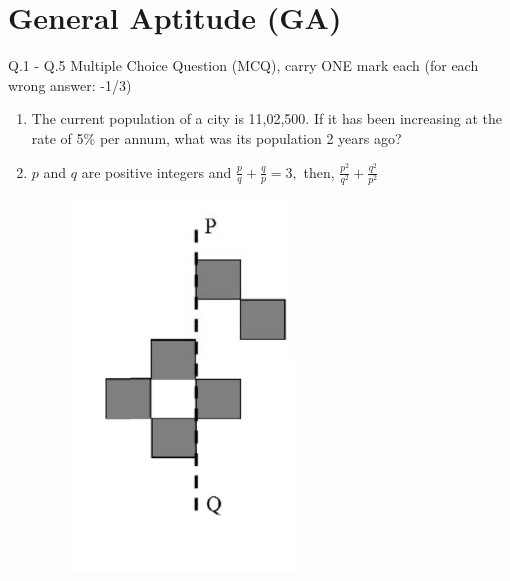 \documentclass[journal]{IEEEtran}
\begin{document}
\section{General Aptitude (GA)}
Q.1 - Q.5 Multiple Choice Question (MCQ), carry ONE mark each (for each wrong answer: -1/3)
\bigskip
\begin{enumerate}[start=1]
	\item The current population of a city is 11,02,500. If it has been increasing at the rate of 5\% per annum, what was its population 2 years ago?
    \hfill{}
\begin{enumerate}
\end{enumerate}

\item  $p$ and $q$ are positive integers and  $\frac{p}{q} + \frac{q}{p} = 3,$ then, $\frac{p^2}{q^2} + \frac{q^2}{p^2}$
\hfill{}
\begin{enumerate}
\end{enumerate}

\begin{figure}[H]
    \centering
    \includegraphics[width=0.3\columnwidth]{figs/image(q3).png}
\end{figure}


\end{enumerate}
\end{document}
